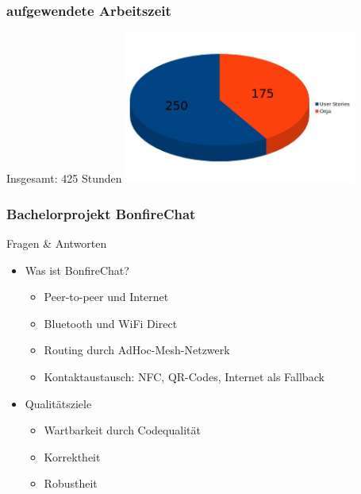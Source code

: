 \documentclass[accentcolor=tud2d,colorbacktitle]{tudbeamer}
\begin{document}
  \begin{frame}
    \frametitle{aufgewendete Arbeitszeit}
    \begin{center}
      \huge{Insgesamt: 425 Stunden}
      \includegraphics[height=5cm]{zeiten2.jpg}
    \end{center}
  \end{frame}


  \begin{frame}
    \frametitle{Bachelorprojekt BonfireChat}
    \begin{center}
      \huge{Fragen \& Antworten}
    \end{center}
    \vspace{0.5cm}
    \begin{multicols}{2}
      \begin{itemize}
        \item Was ist BonfireChat?
          \begin{itemize}
            \item Peer-to-peer und Internet
            \item Bluetooth und WiFi Direct
            \item Routing durch AdHoc-Mesh-Netzwerk
            \item Kontaktaustausch: NFC, QR-Codes, Internet als Fallback
          \end{itemize}
        \item Qualitätsziele
          \begin{itemize}
            \item Wartbarkeit durch Codequalität
            \item Korrektheit
            \item Robustheit
          \end{itemize}
          \vspace{1cm}
      \end{itemize}
    \end{multicols}
  \end{frame}
\end{document}

